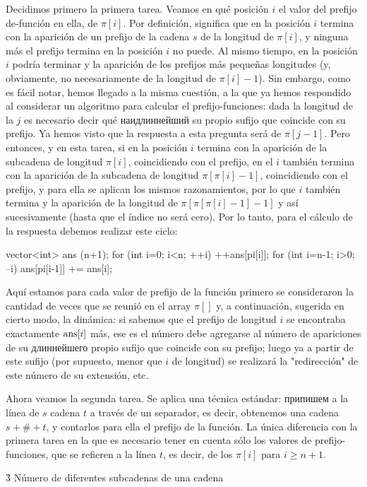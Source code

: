 Decidimos primero la primera tarea. Veamos en qué posición $i$ el valor del prefijo de-función en ella, de $\pi[i]$. Por definición, significa que en la posición $i$ termina con la aparición de un prefijo de la cadena $s$ de la longitud de $\pi[i]$, y ninguna más el prefijo termina en la posición $i$ no puede. Al mismo tiempo, en la posición $i$ podría terminar y la aparición de los prefijos más pequeñas longitudes (y, obviamente, no necesariamente de la longitud de $\pi[i]-1$). Sin embargo, como es fácil notar, hemos llegado a la misma cuestión, a la que ya hemos respondido al considerar un algoritmo para calcular el prefijo-funciones: dada la longitud de la $j$ es necesario decir qué наидлиннейший su propio sufijo que coincide con su prefijo. Ya hemos visto que la respuesta a esta pregunta será de $\pi[j-1]$. Pero entonces, y en esta tarea, si en la posición $i$ termina con la aparición de la subcadena de longitud $\pi[i]$, coincidiendo con el prefijo, en el $i$ también termina con la aparición de la subcadena de longitud $\pi[\pi[i]-1]$, coincidiendo con el prefijo, y para ella se aplican los mismos razonamientos, por lo que $i$ también termina y la aparición de la longitud de $\pi[\pi[\pi[i]-1]-1]$ y así sucesivamente (hasta que el índice no será cero). Por lo tanto, para el cálculo de la respuesta debemos realizar este ciclo:

\code
vector<int> ans (n+1);
for (int i=0; i<n; ++i)
++ans[pi[i]];
for (int i=n-1; i>0; --i)
ans[pi[i-1]] += ans[i];
\endcode

Aquí estamos para cada valor de prefijo de la función primero se consideraron la cantidad de veces que se reunió en el array $\pi []$ y, a continuación, sugerida en cierto modo, la dinámica: si sabemos que el prefijo de longitud $i$ se encontraba exactamente ${\rm ans}[i]$ más, ese es el número debe agregarse al número de apariciones de su длиннейшего propio sufijo que coincide con su prefijo; luego ya a partir de este sufijo (por supuesto, menor que $i$ de longitud) se realizará la "redirección" de este número de su extensión, etc.

Ahora veamos la segunda tarea. Se aplica una técnica estándar: припишем a la línea de $s$ cadena $t$ a través de un separador, es decir, obtenemos una cadena $s+\#+t$, y contarlos para ella el prefijo de la función. La única diferencia con la primera tarea en la que es necesario tener en cuenta sólo los valores de prefijo-funciones, que se refieren a la línea $t$, es decir, de los $\pi[i]$ para $i \ge n+1$.


\h3{ Número de diferentes subcadenas de una cadena }


